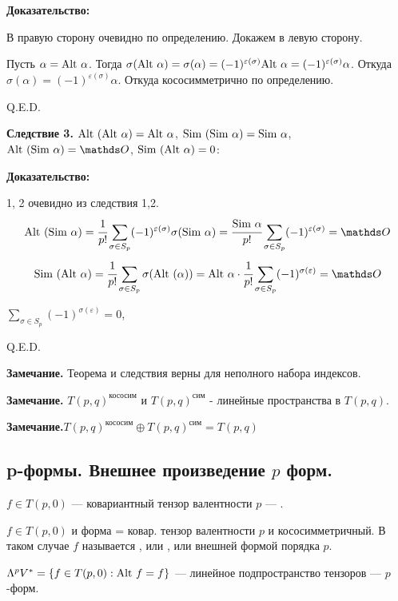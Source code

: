 \textbf{Доказательство:}

В правую сторону очевидно по определению. Докажем в левую сторону.

Пусть $\alpha = \text{Alt } \alpha$. Тогда $\sigma(\text{Alt } \alpha) = \sigma(\alpha) = (-1)^{\varepsilon(\sigma)}\text{Alt } \alpha = (-1)^{\varepsilon(\sigma)}\alpha$. Откуда $\sigma(\alpha) = (-1)^{\varepsilon(\sigma)} \alpha$. Откуда кососимметрично по определению.

\hfill Q.E.D.

\textbf{Следствие 3.} $\text{Alt }(\text{Alt } \alpha) = \text{Alt } \alpha$, $\text{Sim }(\text{Sim } \alpha) = \text{Sim } \alpha$, $\Alt(\Sim \alpha) = \zero$, $\text{Sim }(\text{Alt } \alpha) = 0$:

\textbf{Доказательство:}

1, 2 очевидно из следствия 1,2.
$$\Alt(\Sim \alpha) = \cfrac{1}{p!}\sum\limits_{\sigma \in S_p}(-1)^{\varepsilon(\sigma)}\sigma(\Sim \alpha) = \cfrac{\Sim \alpha}{p!}\sum\limits_{\sigma \in S_p}(-1)^{\varepsilon(\sigma)} = \zero$$
$$\Sim (\Alt \alpha) = \cfrac{1}{p!}\sum\limits_{\sigma \in S_p}\sigma(\Alt(\alpha)) = \Alt\alpha \cdot \cfrac{1}{p!}\sum\limits_{\sigma \in S_p} (-1)^{\sigma(\varepsilon)} =\zero$$

$\sum\limits_{\sigma \in S_p} (-1)^{\sigma(\varepsilon)} = 0$,

\hfill Q.E.D.

\textbf{Замечание.} Теорема и следствия верны для неполного набора индексов.

\textbf{Замечание.} $T(p,q)^{\text{кососим}}$ и  $T(p,q)^{\text{сим}}$ - линейные пространства в $T(p,q)$.

\textbf{Замечание.}$T(p,q)^{\text{кососим}} \oplus T(p,q)^{\text{сим}} = T(p,q)$

\pagebreak

\subsection{p-формы. Внешнее произведение $p$ форм.}

 $f \in T(p,0)$ --- ковариантный тензор валентности $p$ --- .

$f \in T(p,0)$ и  форма = ковар. тензор валентности $p$ и кососимметричный. В таком случае $f$ называется , или , или внешней формой порядка $p$.

$\Lambda^pV^* = \{f \in T(p,0): \text{Alt } f = f\}$ --- линейное подпространство тензоров ---  $p$-форм.

